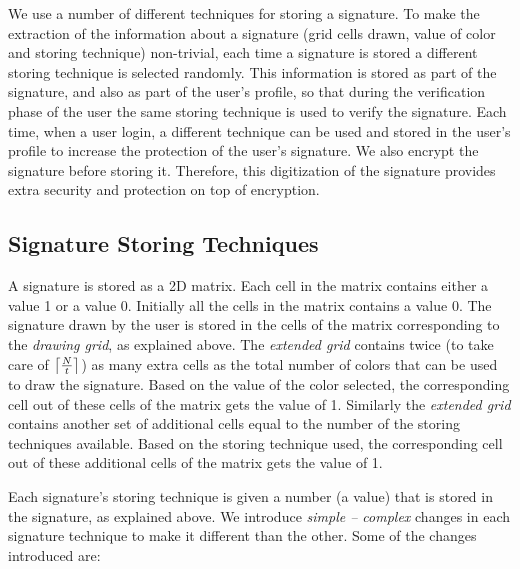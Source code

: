 \documentclass[conference]{IEEEtran}
\DeclarePairedDelimiter\ceil{\lceil}{\rceil}
\begin{document}
We use a number of different techniques for storing a signature. To make the extraction of the information about a signature (grid cells drawn, value of color and storing technique) non-trivial, each time a signature is stored a different storing technique is selected randomly. This information is stored as part of the signature, and also as part of the user's profile, so that during the verification phase of the user the same storing technique is used to verify the signature. Each time, when a user login, a different technique can be used and stored in the user's profile to increase the protection of the user's signature. We also encrypt the signature before storing it. Therefore, this digitization of the signature provides extra security and protection on top of encryption.


\subsection{Signature Storing Techniques}\label{sec:storing-techniques}



A signature is stored as a 2D matrix. Each cell in the matrix contains either a value 1 or a value 0. Initially all the cells in the matrix contains a value 0. The signature drawn by the user is stored in the cells of the matrix corresponding to the \emph{drawing grid}, as explained above. The \emph{extended grid} contains twice (to take care of $\ceil*{\frac{N}{t}}$) as many extra cells as the total number of colors that can be used to draw the signature. Based on the value of the color selected, the corresponding cell out of these cells of the matrix gets the value of 1. Similarly the \emph{extended grid} contains another set of additional cells equal to the number of the storing techniques available. Based on the storing technique used, the corresponding cell out of these additional cells of the matrix gets the value of 1.

Each signature's storing technique is given a number (a value) that is stored in the signature, as explained above. We introduce \emph{simple -- complex} changes in each signature technique to make it different than the other. Some of the changes introduced are:
\end{document}
